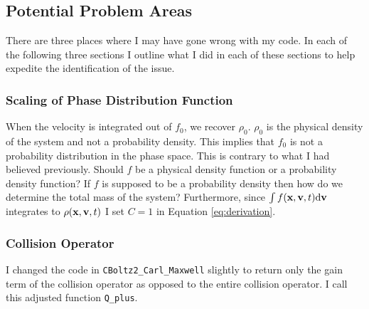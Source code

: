 \documentclass{article}
\def\t{\text}
\def\b{\textbf}
\begin{document}
\subsection{Potential Problem Areas}
There are three places where I may have gone wrong with my code. In each of the following three sections I outline what I did in each of these sections to help expedite the identification of the issue.

\subsubsection{Scaling of Phase Distribution Function}
When the velocity is integrated out of $f_0$, we recover $\rho_0$. $\rho_0$ is the physical density of the system and not a probability density. This implies that $f_0$ is not a probability distribution in the phase space. This is contrary to what I had believed previously. Should $f$ be a physical density function or a probability density function? If $f$ is supposed to be a probability density then how do we determine the total mass of the system? Furthermore, since $\int f(\b x, \b v, t) \t d \b v$ integrates to $\rho(\b x, \b v, t)$ I set $C=1$ in Equation \ref{eq:derivation}.

\subsubsection{Collision Operator}

I changed the code in \verb|CBoltz2_Carl_Maxwell| slightly to return only the gain term of the collision operator as opposed to the entire collision operator. I call this adjusted function \verb|Q_plus|. \bigskip
\end{document}
